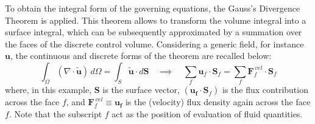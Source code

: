 \documentclass[12pt, a4paper, twoside, openright]{book}
\begin{document}
To obtain the integral form of the governing equations, the Gauss's Divergence Theorem is applied. This theorem allows to transform the volume integral into a surface integral, which can be subsequently approximated by a summation over the faces of the discrete control volume. Considering a generic field, for instance $\bm{u}$, the continuous and discrete forms of the theorem are recalled below:
\begin{equation}
    \int_{\Omega} \left( \nabla \cdot \bm{\widetilde{u}} \right) \, d\Omega 
    = 
    \int_{S} \bm{\widetilde{u}} \cdot d \bm{S}
    \quad \implies \quad
    \sum_{f} \bm{u}_f \cdot \bm{S}_{f}
    = 
    \sum_{f} \bm{F}_f^{\, vel} \cdot \bm{S}_{f}
\end{equation}
where, in this example, $\bm{S}$ is the surface vector, $\left( \bm{u_f} \cdot \bm{S}_{f} \right)$ is the flux contribution across the face $f$, and $\bm{F}_f^{\, vel} \equiv \bm{u_f}$ is the (velocity) flux density again across the face $f$. Note that the subscript $f$ act as the position of evaluation of fluid quantities.
\end{document}
